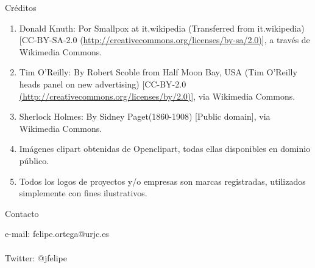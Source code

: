 \begin{frame}{Créditos}
\begin{enumerate}
 \item Donald Knuth: Por Smallpox at it.wikipedia (Transferred from it.wikipedia) 
 [CC-BY-SA-2.0 (\url{http://creativecommons.org/licenses/by-sa/2.0)}], a 
 través de Wikimedia Commons.
 \item Tim O'Reilly: By Robert Scoble from Half Moon Bay, USA (Tim O'Reilly 
 heads panel on new advertising) [CC-BY-2.0 \url{(http://creativecommons.org/licenses/by/2.0)}], 
 via Wikimedia Commons.
 \item Sherlock Holmes: By Sidney Paget(1860-1908) [Public domain], via Wikimedia Commons.
 \item Imágenes clipart obtenidas de Openclipart, todas ellas disponibles en dominio público.
 \item Todos los logos de proyectos y/o empresas son marcas registradas, utilizados simplemente con fines ilustrativos.
\end{enumerate}
\end{frame}



\begin{frame}{Contacto}
\begin{huge}
e-mail: felipe.ortega@urjc.es\\~\\
Twitter: @jfelipe
\end{huge}
\end{frame}



